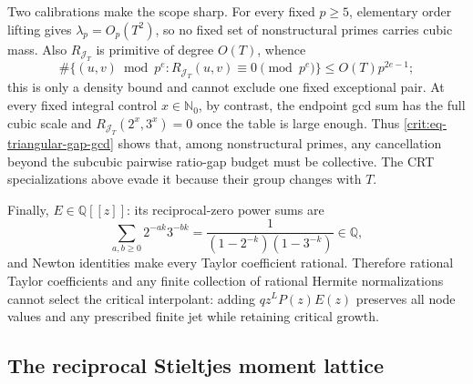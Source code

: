 \documentclass[11pt,oneside]{article}
\theoremstyle{definition}
\theoremstyle{remark}
\newcommand{\Nzero}{\mathbb N_0}
\newcommand{\Q}{\mathbb Q}
\begin{document}
Two calibrations make the scope sharp.  For every fixed $p\ge5$, elementary order lifting
gives $\lambda_p=O_p(T^2)$, so no fixed set of nonstructural primes carries cubic mass.
Also $R_{\mathcal J_T}$ is primitive of degree $O(T)$, whence
\[
 \#\{(u,v)\bmod p^e:R_{\mathcal J_T}(u,v)\equiv0\pmod{p^e}\}
 \le O(T)p^{2e-1};
\]
this is only a density bound and cannot exclude one fixed exceptional pair.  At every fixed
integral control $x\in\Nzero$, by contrast, the endpoint gcd sum has the full cubic scale and
$R_{\mathcal J_T}(2^x,3^x)=0$ once the table is large enough.  Thus
\eqref{crit:eq-triangular-gap-gcd} shows that, among nonstructural primes, any cancellation
beyond the subcubic pairwise ratio-gap budget must be collective.  The CRT specializations
above evade it because their group changes with $T$.

Finally, $E\in\Q[[z]]$: its reciprocal-zero power sums are
\[
 \sum_{a,b\ge0}2^{-ak}3^{-bk}
 =\frac1{(1-2^{-k})(1-3^{-k})}\in\Q,
\]
and Newton identities make every Taylor coefficient rational.  Therefore rational Taylor
coefficients and any finite collection of rational Hermite normalizations cannot select the
critical interpolant: adding $qz^LP(z)E(z)$ preserves all node values and any prescribed
finite jet while retaining critical growth.

\subsection{The reciprocal Stieltjes moment lattice}
\label{crit:reciprocal-moment-lattice}
\end{document}
